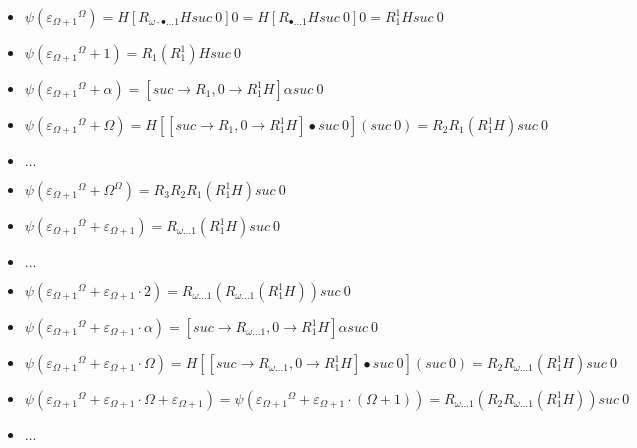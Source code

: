 \documentclass[10pt]{article}
\begin{document}
\begin{itemize}
\item \( \psi({\varepsilon_{\Omega+1}}^\Omega) = H [R_{\omega \cdot \bullet \ldots 1} H suc\ 0] 0 = H [R_{\bullet \ldots 1} H suc\ 0] 0 = R^1_1 H suc\ 0 \)

\item \( \psi({\varepsilon_{\Omega+1}}^\Omega+1) = R_1 (R^1_1) H suc\ 0 \)

\item \( \psi({\varepsilon_{\Omega+1}}^\Omega+\alpha) = [suc \rightarrow R_1, 0 \rightarrow R^1_1 H] \alpha suc\ 0 \)

\item \( \psi({\varepsilon_{\Omega+1}}^\Omega+\Omega) = H [[suc \rightarrow R_1, 0 \rightarrow R^1_1 H] \bullet suc\ 0] (suc\ 0) = R_2 R_1 (R^1_1 H) suc\ 0 \)

\item \( \ldots \)

\item \( \psi({\varepsilon_{\Omega+1}}^\Omega+\Omega^\Omega) = R_3 R_2 R_1 (R^1_1 H) suc\ 0 \)

\item \( \psi({\varepsilon_{\Omega+1}}^\Omega+\varepsilon_{\Omega+1}) = R_{\omega \ldots 1} (R^1_1 H) suc\ 0 \)

\item \( \ldots \)

\item \( \psi({\varepsilon_{\Omega+1}}^\Omega+\varepsilon_{\Omega+1} \cdot 2) = R_{\omega \ldots 1} (R_{\omega \ldots 1} (R^1_1 H)) suc\ 0 \)

\item \( \psi({\varepsilon_{\Omega+1}}^\Omega+\varepsilon_{\Omega+1} \cdot \alpha) = [suc \rightarrow R_{\omega \ldots 1}, 0 \rightarrow R^1_1 H] \alpha suc\ 0 \)

\item \( \psi({\varepsilon_{\Omega+1}}^\Omega+\varepsilon_{\Omega+1} \cdot \Omega) = H [[suc \rightarrow R_{\omega \ldots 1}, 0 \rightarrow R^1_1 H] \bullet suc\ 0] (suc\ 0) = R_2 R_{\omega \ldots 1} (R^1_1 H) suc\ 0 \)

\item \( \psi({\varepsilon_{\Omega+1}}^\Omega+\varepsilon_{\Omega+1} \cdot \Omega+\varepsilon_{\Omega+1}) = \psi({\varepsilon_{\Omega+1}}^\Omega+\varepsilon_{\Omega+1} \cdot (\Omega+1)) = R_{\omega \ldots 1} (R_2 R_{\omega \ldots 1} (R^1_1 H)) suc\ 0 \)

\item \( \ldots \)


\end{itemize}
\end{document}
